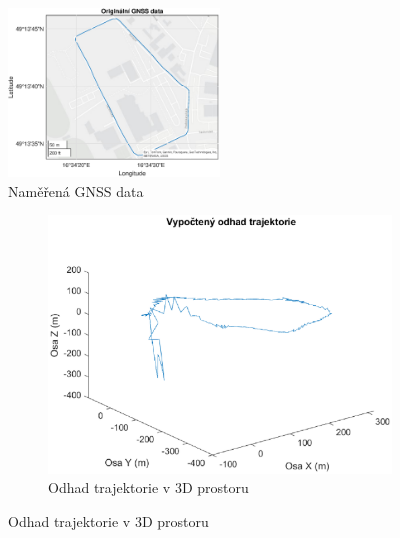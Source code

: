 \begin{figure}[h]
     \centering
         \includegraphics[width=0.5\textwidth]{obrazky/matlab/2gnss}
         \caption{Naměřená GNSS data}
        \label{fig:gnssOriginal}
\end{figure}

\begin{figure}[h]
     \centering
     \begin{subfigure}[b]{0.49\textwidth}
         \centering
         \includegraphics[width=\textwidth]{obrazky/matlab/2gnssIMU3d}
         \caption{Odhad trajektorie v 3D prostoru}   
         

\end{subfigure}
\end{figure}
